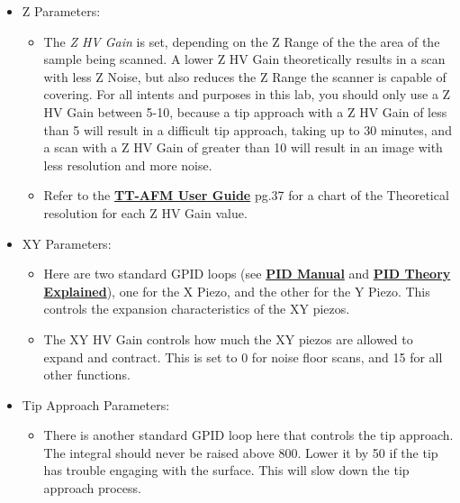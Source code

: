 \documentclass{../lab}
\begin{document}
\begin{itemize}
    \item Z Parameters:

    \begin{itemize}
        \item The \emph{Z HV Gain} is set, depending on the Z Range of the the area of the sample being scanned.  A lower Z HV Gain theoretically results in a scan with less Z Noise, but also reduces the Z Range the scanner is capable of covering.  For all intents and purposes in this lab, you should only use a Z HV Gain between 5-10, because a tip approach with a Z HV Gain of less than 5 will result in a difficult tip approach, taking up to 30 minutes, and a scan with a Z HV Gain of greater than 10 will result in an image with less resolution and more noise.

        \item Refer to the \href{http://experimentationlab.berkeley.edu/sites/default/files/AFMImages/TT_AFM\%20User-Guide-V2.2-600DPI.pdf}{\textbf{TT-AFM User Guide}} pg.37 for a chart of the Theoretical resolution for each Z HV Gain value.

    \end{itemize}

    \item XY Parameters:

    \begin{itemize}
        \item Here are two standard GPID loops (see  \href{http://experimentationlab.berkeley.edu/sites/default/files/PID_Manual.pdf}{\textbf{PID Manual}} and \href{http://experimentationlab.berkeley.edu/sites/default/files/PID_Theory_Explained.pdf}{\textbf{PID Theory Explained}}), one for the X Piezo, and the other for the Y Piezo.  This controls the expansion characteristics of the XY piezos.

        \item The XY HV Gain controls how much the XY piezos are allowed to expand and contract.  This is set to 0 for noise floor scans, and 15 for all other functions.

    \end{itemize}

    \item Tip Approach Parameters:
    \begin{itemize}
        \item There is another standard GPID loop here that controls the tip approach.  The integral should never be raised above 800. Lower it by 50 if the tip has trouble engaging with the surface.  This will slow down the tip approach process.


\end{itemize}
\end{itemize}
\end{document}
